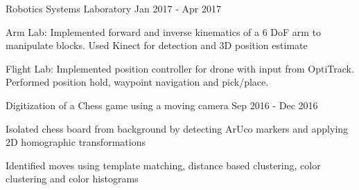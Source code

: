 

\begin{cventries2}

\cventrymini
{Robotics Systems Laboratory} %
{Jan 2017 - Apr 2017} %
{
	\begin{cvitems} 
		\item {Arm Lab: Implemented forward and inverse kinematics of a 6 DoF arm to manipulate blocks. Used Kinect for detection and 3D position estimate}
		\item{Flight Lab: Implemented position controller for drone with input from OptiTrack. Performed position hold, waypoint navigation and pick/place.}
	\end{cvitems}
} %

\vspace{2mm}
	\cventrymini
	{Digitization of a Chess game using a moving camera} %
	{Sep 2016 - Dec 2016} %
	{
		\begin{cvitems} 
			\item {Isolated chess board from background by detecting ArUco markers and applying 2D homographic transformations}
			\item{Identified moves using template matching, distance based clustering, color clustering and color histograms}
		\end{cvitems}
	} %

\end{cventries2}    





